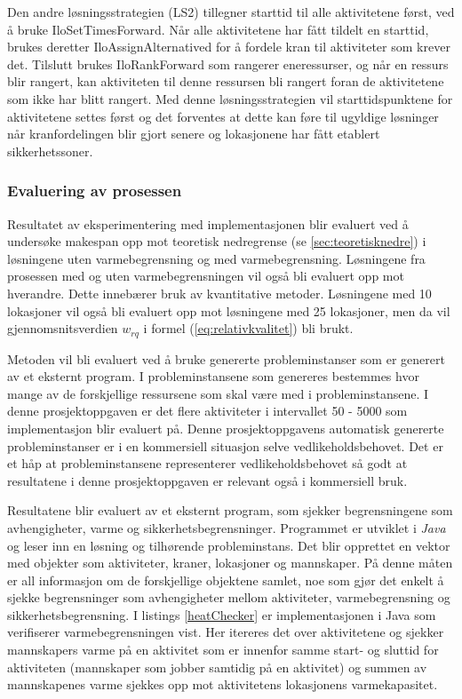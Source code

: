 Den andre løsningsstrategien (LS2) tillegner starttid til alle aktivitetene først, ved å bruke IloSetTimesForward. Når alle aktivitetene har fått tildelt en starttid, brukes deretter IloAssignAlternatived for å fordele kran til aktiviteter som krever det. Tilslutt brukes IloRankForward som rangerer eneressurser, og når en ressurs blir rangert, kan aktiviteten til denne ressursen bli rangert foran de aktivitetene som ikke har blitt rangert. Med denne løsningsstrategien vil starttidspunktene for aktivitetene settes først og det forventes at dette kan føre til ugyldige løsninger når kranfordelingen blir gjort senere og lokasjonene har fått etablert sikkerhetssoner.

\subsubsection{Evaluering av prosessen}
Resultatet av eksperimentering med implementasjonen blir evaluert ved å undersøke makespan opp mot teoretisk nedregrense (se \ref{sec:teoretisknedre}) i løsningene uten varmebegrensning og med varmebegrensning. Løsningene fra prosessen med og uten varmebegrensningen vil også bli evaluert opp mot hverandre. Dette innebærer bruk av kvantitative metoder. Løsningene med 10 lokasjoner vil også bli evaluert opp mot løsningene med 25 lokasjoner, men da vil gjennomsnitsverdien $w_{rq}$ i formel (\ref{eq:relativkvalitet}) bli brukt.

Metoden vil bli evaluert ved å bruke genererte probleminstanser som er generert av et eksternt program. I probleminstansene som genereres bestemmes hvor mange av de forskjellige ressursene som skal være med i probleminstansene. I denne prosjektoppgaven er det flere aktiviteter i intervallet 50 - 5000 som implementasjon blir evaluert på. Denne prosjektoppgavens automatisk genererte probleminstanser er i en kommersiell situasjon selve vedlikeholdsbehovet. Det er et håp at probleminstansene representerer vedlikeholdsbehovet så godt at resultatene i denne prosjektoppgaven er relevant også i kommersiell bruk.

Resultatene blir evaluert av et eksternt program, som sjekker begrensningene som avhengigheter, varme og sikkerhetsbegrensninger. Programmet er utviklet i \textit{Java} og leser inn en løsning og tilhørende probleminstans. Det blir opprettet en vektor med objekter som aktiviteter, kraner, lokasjoner og mannskaper. På denne måten er all informasjon om de forskjellige objektene samlet, noe som gjør det enkelt å sjekke begrensninger som avhengigheter mellom aktiviteter, varmebegrensning og sikkerhetsbegrensning. I listings \ref{heatChecker} er implementasjonen i Java som verifiserer varmebegrensningen vist. Her itereres det over aktivitetene og sjekker mannskapers varme på en aktivitet som er innenfor samme start- og sluttid for aktiviteten (mannskaper som jobber samtidig på en aktivitet) og summen av mannskapenes varme sjekkes opp mot aktivitetens lokasjonens varmekapasitet.


